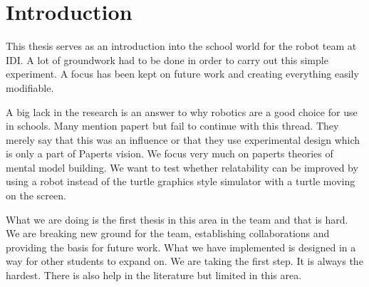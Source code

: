 \chapter{Introduction}
This thesis serves as an introduction into the school world for the robot team at IDI. A lot of groundwork had to be done in order to carry out this simple experiment. A focus has been kept on future work and creating everything easily modifiable. 

A big lack in the research is an answer to why robotics are a good choice for use in schools. Many mention papert but fail to continue with this thread. They merely say that this was an influence or that they use experimental design which is only a part of Paperts vision. We focus very much on paperts theories of mental model building. We want to test whether relatability can be improved by using a robot instead of the turtle graphics style simulator with a turtle moving on the screen. 

What we are doing is the first thesis in this area in the team and that is hard. We are breaking new ground for the team, establishing collaborations and providing the basis for future work. What we have implemented is designed in a way for other students to expand on. We are taking the first step. It is always the hardest. There is also help in the literature but limited in this area. 





